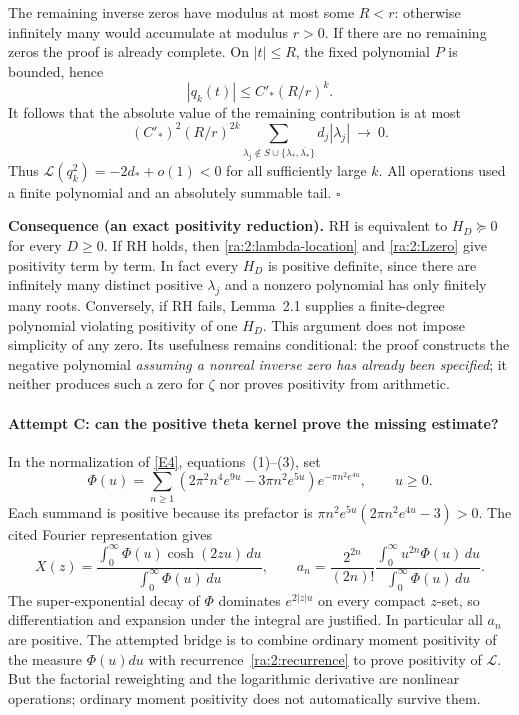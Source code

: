 \documentclass[11pt]{article}
\newcommand{\eref}[2]{\hyperlink{extra:#1:#2}{[E#2]}}
\begin{document}
The remaining inverse zeros have modulus at most some $R<r$: otherwise
infinitely many would accumulate at modulus $r>0$. If there are no remaining
zeros the proof is already complete. On $|t|\le R$, the fixed polynomial
$P$ is bounded, hence
\[
 |q_k(t)|\le C'_* (R/r)^k.
\]
It follows that the absolute value of the remaining contribution is at most
\begin{equation}\label{ra:2:filter-tail}
 (C'_*)^2(R/r)^{2k}\sum_{\lambda_j\notin S\cup\{\lambda_*,\overline{\lambda_*}\}}
                  d_j|\lambda_j|\ \longrightarrow\ 0.
\end{equation}
Thus $\mathcal L(q_k^2)=-2d_*+o(1)<0$ for all sufficiently large $k$.
All operations used a finite polynomial and an absolutely summable tail.
\hfill$\square$

\medskip
\textbf{Consequence (an exact positivity reduction).}
RH is equivalent to $H_D\succeq0$ for every $D\ge0$. If RH holds, then
\eqref{ra:2:lambda-location} and \eqref{ra:2:Lzero} give positivity
term by term. In fact every $H_D$ is positive definite, since there are
infinitely many distinct positive $\lambda_j$ and a nonzero polynomial has
only finitely many roots. Conversely, if RH fails, Lemma~2.1 supplies a
finite-degree polynomial violating positivity of one $H_D$. This argument
does not impose simplicity of any zero. Its usefulness remains conditional:
the proof constructs the negative polynomial \emph{assuming a nonreal
inverse zero has already been specified}; it neither produces such a zero
for $\zeta$ nor proves positivity from arithmetic.

\paragraph{Attempt C: can the positive theta kernel prove the missing estimate?}
In the normalization of \eref{2}{4}, equations~(1)--(3), set
\[
 \Phi(u)=\sum_{n\ge1}
 (2\pi^2n^4e^{9u}-3\pi n^2e^{5u})e^{-\pi n^2e^{4u}},\qquad u\ge0.
\]
Each summand is positive because its prefactor is
$\pi n^2e^{5u}(2\pi n^2e^{4u}-3)>0$. The cited Fourier representation gives
\begin{equation}\label{ra:2:theta}
 X(z)=\frac{\int_0^\infty\Phi(u)\cosh(2zu)\,du}
            {\int_0^\infty\Phi(u)\,du},\qquad
 a_n=\frac{2^{2n}}{(2n)!}
      \frac{\int_0^\infty u^{2n}\Phi(u)\,du}
           {\int_0^\infty\Phi(u)\,du}.
\end{equation}
The super-exponential decay of $\Phi$ dominates
$e^{2|z|u}$ on every compact $z$-set, so differentiation and expansion under
the integral are justified. In particular all $a_n$ are positive.
The attempted bridge is to combine ordinary moment positivity of the measure
$\Phi(u)du$ with recurrence~\eqref{ra:2:recurrence} to prove positivity of
$\mathcal L$. But the factorial reweighting and the logarithmic derivative
are nonlinear operations; ordinary moment positivity does not automatically
survive them.
\end{document}
